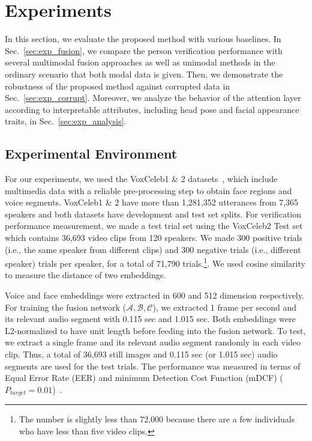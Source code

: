 \documentclass{article}
\begin{document}
\section{Experiments}
In this section, we evaluate the proposed method with various baselines. 
In Sec.~\ref{sec:exp_fusion}, we compare the person verification performance with several multimodal fusion approaches as well as unimodal methods in the ordinary scenario that both modal data is given.
Then, we demonstrate the robustness of the proposed method against corrupted data in Sec.~\ref{sec:exp_corrupt}.
Moreover, we analyze the behavior of the attention layer according to interpretable attributes, including head pose and facial appearance traits, in Sec.~\ref{sec:exp_analysis}.

\subsection{Experimental Environment}\label{sec:exp_env}
For our experiments, 
we used the VoxCeleb1 \& 2 datasets~\cite{Nagraniy2017,Chung2018}, which include multimedia data with a reliable pre-processing step to obtain face regions and voice segments.
VoxCeleb1 \& 2 have more than 1,281,352 utterances from 7,365 speakers and both datasets have development and test set splits.
For verification performance measurement, we made a test trial set using the VoxCeleb2 Test set which contains 36,693 video clips from 120 speakers. 
We made 300 positive trials (i.e., the same speaker from different clips) and 300 negative trials (i.e., different speaker) trials per speaker, for a total of 71,790 trials.\footnote{The number is slightly less than 72,000 because there are a few individuals who have less than five video clips.}. We used cosine similarity to measure the distance of two embeddings.

Voice and face embeddings were extracted in 600 and 512 dimension respectively. For training the fusion network ($\mathcal{A},\mathcal{B},\mathcal{C}$), we extracted 1 frame per second and its relevant audio segment with 0.115 sec and 1.015 sec. Both embeddings were L2-normalized to have unit length before feeding into the fusion network. To test, we extract a single frame and its relevant audio segment randomly in each video clip. Thus, a total of 36,693 still images and 0.115 sec (or 1.015 sec) audio segments are used for the test trials. The performance was measured in terms of Equal Error Rate (EER) and minimum Detection Cost Function (mDCF) ($P_\textit{target}=0.01$)~\cite{sre16}. 
\end{document}
